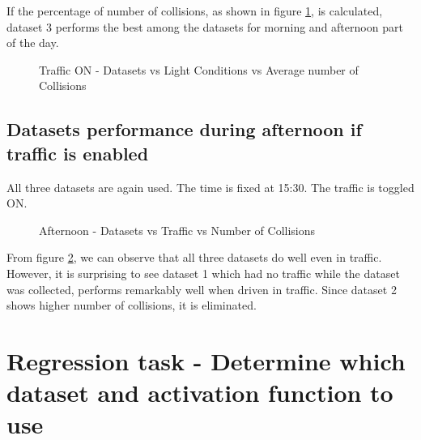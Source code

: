 If the percentage of number of collisions, as shown in figure
\ref{fig:dsvslcvstrafficavgncolsetup1a}, is calculated, dataset 3 performs the best among
the datasets for morning and afternoon part of the day.
\begin{figure}
	\centering
    \def\svgwidth{0.6\textwidth}
    \caption{Traffic ON - Datasets vs Light Conditions vs Average number of Collisions}
    \label{fig:dsvslcvstrafficavgncolsetup1a}
\end{figure}

\subsection{Datasets performance during afternoon if traffic is enabled}
All three datasets are again used. The time is fixed at 15:30. The traffic is toggled ON.

\begin{figure}
	\centering
    \def\svgwidth{0.6\textwidth}
    \caption{Afternoon - Datasets vs Traffic vs Number of Collisions}
    \label{fig:dsvslcvstrafficncolsetup2}
\end{figure}
From figure \ref{fig:dsvslcvstrafficncolsetup2}, we can observe that all three datasets do
well even in traffic. However, it is surprising to see dataset 1 which had no traffic
while the dataset was collected, performs remarkably well when driven in traffic.
Since dataset 2 shows higher number of collisions, it is eliminated.

\section{Regression task - Determine which dataset and activation function to use}

